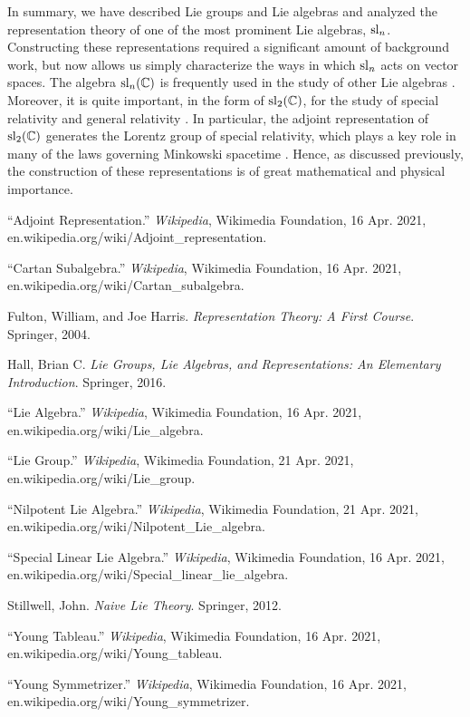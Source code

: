 \documentclass[11pt, a4paper, oneside]{article}
\theoremstyle{plain}
\theoremstyle{definition}
\theoremstyle{example}
\begin{document}
In summary, we have described Lie groups and Lie algebras and analyzed the representation theory of one of the most prominent Lie algebras, $\sl_n$. Constructing these representations required a significant amount of background work, but now allows us simply characterize the ways in which $\sl_n$ acts on vector spaces. The algebra $\sl_n(\CC)$ is frequently used in the study of other Lie algebras \cite{specialwiki}. Moreover, it is quite important, in the form of $\sl_2(\CC)$, for the study of special relativity and general relativity \cite{specialwiki}. In particular, the adjoint representation of $\sl_2(\CC)$ generates the Lorentz group of special relativity, which plays a key role in many of the laws governing Minkowski spacetime \cite{specialwiki}. Hence, as discussed previously, the construction of these representations is of great mathematical and physical importance.

\newpage
\begin{thebibliography}{9}

“Adjoint Representation.” \textit{Wikipedia}, Wikimedia Foundation, 16 Apr. 2021, \\ en.wikipedia.org/wiki/Adjoint\_representation. 

“Cartan Subalgebra.” \textit{Wikipedia}, Wikimedia Foundation, 16 Apr. 2021, \\ en.wikipedia.org/wiki/Cartan\_subalgebra. 

Fulton, William, and Joe Harris. \textit{Representation Theory: A First Course}. Springer, 2004. 

Hall, Brian C. \textit{Lie Groups, Lie Algebras, and Representations: An Elementary Introduction}. Springer, 2016.  

“Lie Algebra.” \textit{Wikipedia}, Wikimedia Foundation, 16 Apr. 2021, \\ en.wikipedia.org/wiki/Lie\_algebra. 

“Lie Group.” \textit{Wikipedia}, Wikimedia Foundation, 21 Apr. 2021, \\ en.wikipedia.org/wiki/Lie\_group. 

“Nilpotent Lie Algebra.” \textit{Wikipedia}, Wikimedia Foundation, 21 Apr. 2021, \\ en.wikipedia.org/wiki/Nilpotent\_Lie\_algebra. 

“Special Linear Lie Algebra.” \textit{Wikipedia}, Wikimedia Foundation, 16 Apr. 2021, \\ en.wikipedia.org/wiki/Special\_linear\_lie\_algebra. 

Stillwell, John. \textit{Naive Lie Theory}. Springer, 2012.

“Young Tableau.” \textit{Wikipedia}, Wikimedia Foundation, 16 Apr. 2021, \\ en.wikipedia.org/wiki/Young\_tableau.  

“Young Symmetrizer.” \textit{Wikipedia}, Wikimedia Foundation, 16 Apr. 2021, \\ en.wikipedia.org/wiki/Young\_symmetrizer. 


\end{thebibliography}
\end{document}

